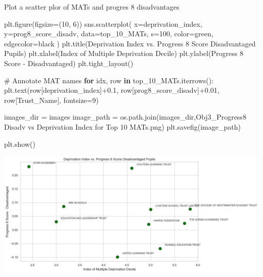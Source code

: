 \documentclass[
  letterpaper,
  DIV=11,
  numbers=noendperiod]{scrartcl}
\newenvironment{Shaded}{\begin{snugshade}}{\end{snugshade}}
\newcommand{\CommentTok}[1]{\textcolor[rgb]{0.37,0.37,0.37}{#1}}
\newcommand{\ControlFlowTok}[1]{\textcolor[rgb]{0.00,0.23,0.31}{\textbf{#1}}}
\newcommand{\DecValTok}[1]{\textcolor[rgb]{0.68,0.00,0.00}{#1}}
\newcommand{\FloatTok}[1]{\textcolor[rgb]{0.68,0.00,0.00}{#1}}
\newcommand{\KeywordTok}[1]{\textcolor[rgb]{0.00,0.23,0.31}{\textbf{#1}}}
\newcommand{\NormalTok}[1]{\textcolor[rgb]{0.00,0.23,0.31}{#1}}
\newcommand{\OperatorTok}[1]{\textcolor[rgb]{0.37,0.37,0.37}{#1}}
\newcommand{\StringTok}[1]{\textcolor[rgb]{0.13,0.47,0.30}{#1}}
\begin{document}
Plot a scatter plor of MATs and progres 8 disadvantages

\begin{Shaded}
\begin{Highlighting}[]
\NormalTok{plt.figure(figsize}\OperatorTok{=}\NormalTok{(}\DecValTok{10}\NormalTok{, }\DecValTok{6}\NormalTok{))}
\NormalTok{sns.scatterplot(}
\NormalTok{    x}\OperatorTok{=}\StringTok{\textquotesingle{}deprivation\_index\textquotesingle{}}\NormalTok{, }
\NormalTok{    y}\OperatorTok{=}\StringTok{\textquotesingle{}prog8\_score\_disadv\textquotesingle{}}\NormalTok{, }
\NormalTok{    data}\OperatorTok{=}\NormalTok{top\_10\_MATs,}
\NormalTok{    s}\OperatorTok{=}\DecValTok{100}\NormalTok{,}
\NormalTok{    color}\OperatorTok{=}\StringTok{\textquotesingle{}green\textquotesingle{}}\NormalTok{,}
\NormalTok{    edgecolor}\OperatorTok{=}\StringTok{\textquotesingle{}black\textquotesingle{}}
\NormalTok{)}
\NormalTok{plt.title(}\StringTok{\textquotesingle{}Deprivation Index vs. Progress 8 Score Disadvantaged Pupils\textquotesingle{}}\NormalTok{)}
\NormalTok{plt.xlabel(}\StringTok{\textquotesingle{}Index of Multiple Deprivation Decile\textquotesingle{}}\NormalTok{)}
\NormalTok{plt.ylabel(}\StringTok{\textquotesingle{}Progress 8 Score {-} Disadvantaged\textquotesingle{}}\NormalTok{)}
\NormalTok{plt.tight\_layout()}

\CommentTok{\# Annotate MAT names}
\ControlFlowTok{for}\NormalTok{ idx, row }\KeywordTok{in}\NormalTok{ top\_10\_MATs.iterrows():}
\NormalTok{    plt.text(row[}\StringTok{\textquotesingle{}deprivation\_index\textquotesingle{}}\NormalTok{]}\OperatorTok{+}\FloatTok{0.1}\NormalTok{, row[}\StringTok{\textquotesingle{}prog8\_score\_disadv\textquotesingle{}}\NormalTok{]}\OperatorTok{+}\FloatTok{0.01}\NormalTok{, }
\NormalTok{             row[}\StringTok{\textquotesingle{}Trust\_Name\textquotesingle{}}\NormalTok{], fontsize}\OperatorTok{=}\DecValTok{9}\NormalTok{)}


\NormalTok{images\_dir }\OperatorTok{=} \StringTok{\textquotesingle{}images\textquotesingle{}}
\NormalTok{image\_path }\OperatorTok{=}\NormalTok{ os.path.join(images\_dir,}\StringTok{\textquotesingle{}Obj3\_Progress8 Disadv vs Deprivation Index for Top 10 MATs.png\textquotesingle{}}\NormalTok{)}
\NormalTok{plt.savefig(image\_path)}

\NormalTok{plt.show()}
\end{Highlighting}
\end{Shaded}

\includegraphics{P4DS_A2_Data_Analysis_Project_files/figure-pdf/cell-103-output-1.png}
\end{document}
